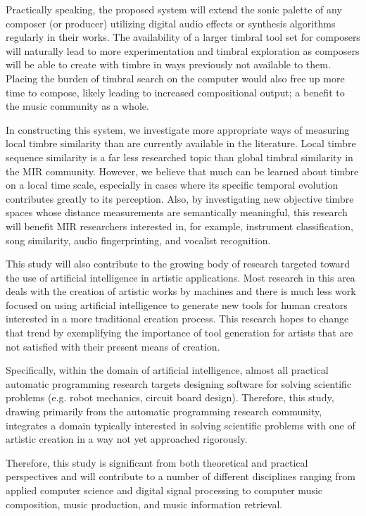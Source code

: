 \documentclass[a4paper,12pt]{report} 	%
\numberwithin{figure}{chapter}
\numberwithin{table}{chapter}
\numberwithin{equation}{chapter}
\begin{document}
\begin{flushleft}
Practically speaking, the proposed system will extend the sonic palette of any composer (or producer) utilizing digital audio effects or synthesis algorithms regularly in their works. The availability of a larger timbral tool set for composers will naturally lead to more experimentation and timbral exploration as composers will be able to create with timbre in ways previously not available to them. Placing the burden of timbral search on the computer would also free up more time to compose, likely leading to increased compositional output; a benefit to the music community as a whole.

In constructing this system, we investigate more appropriate ways of measuring local timbre similarity than are currently available in the literature. Local timbre sequence similarity is a far less researched topic than global timbral similarity in the MIR community. However, we believe that much can be learned about timbre on a local time scale, especially in cases where its specific temporal evolution contributes greatly to its perception. Also, by investigating new objective timbre spaces whose distance measurements are semantically meaningful, this research will benefit MIR researchers interested in, for example, instrument classification, song similarity, audio fingerprinting, and vocalist recognition.

This study will also contribute to the growing body of research targeted toward the use of artificial intelligence in artistic applications. Most research in this area deals with the creation of artistic works by machines and there is much less work focused on using artificial intelligence to generate new tools for human creators interested in a more traditional creation process. This research hopes to change that trend by exemplifying the importance of tool generation for artists that are not satisfied with their present means of creation.

Specifically, within the domain of artificial intelligence, almost all practical automatic programming research targets designing software for solving scientific problems (e.g. robot mechanics, circuit board design). Therefore, this study, drawing primarily from the automatic programming research community, integrates a domain typically interested in solving scientific problems with one of artistic creation in a way not yet approached rigorously.

Therefore, this study is significant from both theoretical and practical perspectives and will contribute to a number of different disciplines ranging from applied computer science and digital signal processing to computer music composition, music production, and music information retrieval.


\end{flushleft}
\end{document}
